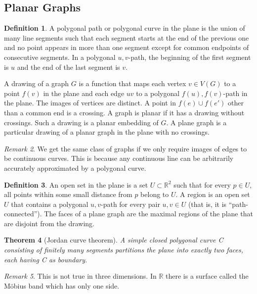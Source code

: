 \documentclass[11pt, fleqn, a4paper, landscape]{article}
\theoremstyle{plain} %
\newtheorem{thm}{Theorem}
\theoremstyle{remark} %
\newtheorem{rem}[thm]{Remark}
\theoremstyle{definition} %
\newtheorem{defi}[thm]{Definition}
\begin{document}
\begin{multicols}{3}
\section{Planar Graphs}
\begin{defi}
A polygonal path or polygonal curve in the plane is the union of many line segments such that each segment starts at the end of the previous one and no point appears in more than one segment except for common endpoints of consecutive segments. In a polygonal $u, v$-path, the beginning of the first segment is $u$ and the end of the last segment is $v$.

A drawing of a graph $G$ is a function that maps each vertex $v\in V (G)$ to a point $f(v)$ in the plane and each edge $uv$ to a polygonal $f(u), f(v)$-path in the plane. The images of vertices are distinct.
A point in $f(e)\cup f(e')$ other than a common end is a crossing. A graph is planar if it has a drawing without crossings. Such a drawing is a planar embedding of $G$. A plane graph is a particular drawing of a planar graph in the plane with no crossings.
\end{defi}
\addtocounter{thm}{1}
\begin{rem}
We get the same class of graphs if we only require images of edges to be continuous curves. This is because any continuous line can be arbitrarily accurately approximated by a polygonal curve.
\end{rem}

\begin{defi}
An open set in the plane is a set $U \subset \mathbb{R}^2$ such that for every $p\in U$, all points within some small distance from $p$ belong to $U$. A region is an open set $U$ that contains a polygonal $u, v$-path for every pair $u, v \in U$ (that is, it is “path-connected”). The faces of a plane graph are the maximal regions of the plane that are disjoint from the drawing.
\end{defi}

\begin{thm}[Jordan curve theorem]
A simple closed polygonal curve C consisting of finitely
many segments partitions the plane into exactly two faces, each having C as boundary.
\end{thm}

\begin{rem}
This is not true in three dimensions. In $\mathbb{R}$ there is a surface called the Möbius band which has only one side.
\end{rem}


\end{multicols}
\end{document}
